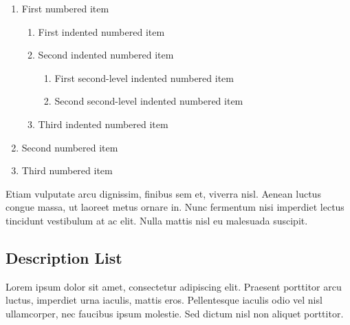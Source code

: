\documentclass[
	a4paper, %
	12pt, %
]{CSSullivanBusinessReport}
\begin{document}
\begin{enumerate}
	\item First numbered item
	\begin{enumerate}
		\item First indented numbered item
		\item Second indented numbered item
		\begin{enumerate}
			\item First second-level indented numbered item
			\item Second second-level indented numbered item
		\end{enumerate}
		\item Third indented numbered item
	\end{enumerate}
	\item Second numbered item
	\item Third numbered item
\end{enumerate}

Etiam vulputate arcu dignissim, finibus sem et, viverra nisl. Aenean luctus congue massa, ut laoreet metus ornare in. Nunc fermentum nisi imperdiet lectus tincidunt vestibulum at ac elit. Nulla mattis nisl eu malesuada suscipit.


\subsection{Description List}

Lorem ipsum dolor sit amet, consectetur adipiscing elit. Praesent porttitor arcu luctus, imperdiet urna iaculis, mattis eros. Pellentesque iaculis odio vel nisl ullamcorper, nec faucibus ipsum molestie. Sed dictum nisl non aliquet porttitor.
\end{document}
